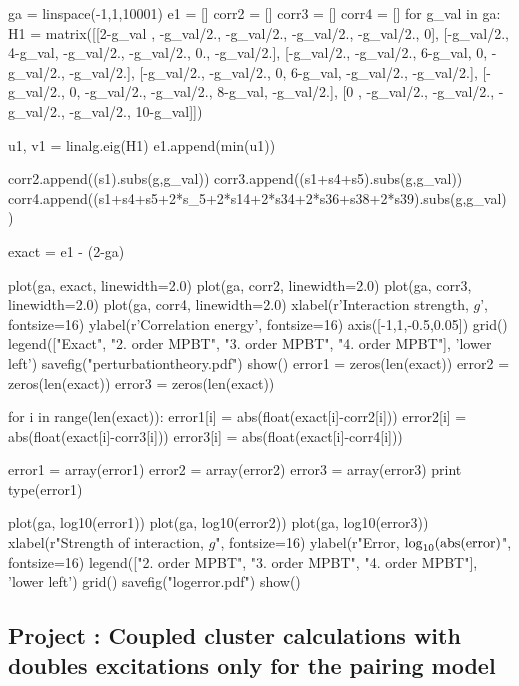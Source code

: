 \documentclass[%
twoside,                 %
final,                   %
10pt]{article}
\newenvironment{doconceexercise}{}{}
\newcounter{doconceexercisecounter}
\begin{document}
\begin{doconceexercise}
ga = linspace(-1,1,10001)
e1 = []
corr2 = []
corr3 = []
corr4 = []
for g_val in ga:
	H1 = matrix([[2-g_val , -g_val/2.,  -g_val/2., -g_val/2., -g_val/2.,     0], 
		        [-g_val/2.,   4-g_val,  -g_val/2., -g_val/2.,    0., -g_val/2.],
		        [-g_val/2., -g_val/2.,    6-g_val,     0, -g_val/2., -g_val/2.],
				[-g_val/2., -g_val/2.,      0,   6-g_val, -g_val/2., -g_val/2.],
				[-g_val/2.,     0,  -g_val/2., -g_val/2.,   8-g_val, -g_val/2.],
				[0    , -g_val/2.,  -g_val/2., -g_val/2., -g_val/2.,  10-g_val]]) 

	u1, v1 = linalg.eig(H1)
	e1.append(min(u1))

	corr2.append((s1).subs(g,g_val))
	corr3.append((s1+s4+s5).subs(g,g_val))
	corr4.append((s1+s4+s5+2*s_5+2*s14+2*s34+2*s36+s38+2*s39).subs(g,g_val))

exact = e1 - (2-ga)

plot(ga, exact, linewidth=2.0)
plot(ga, corr2, linewidth=2.0)
plot(ga, corr3, linewidth=2.0)
plot(ga, corr4, linewidth=2.0)
xlabel(r'Interaction strength, $g$', fontsize=16)
ylabel(r'Correlation energy', fontsize=16)
axis([-1,1,-0.5,0.05])
grid()
legend(["Exact", "2. order MPBT", "3. order MPBT", "4. order MPBT"], 'lower left')
savefig("perturbationtheory.pdf")
show()
error1 = zeros(len(exact))
error2 = zeros(len(exact))
error3 = zeros(len(exact))

for i in range(len(exact)):
	error1[i] = abs(float(exact[i]-corr2[i]))
	error2[i] = abs(float(exact[i]-corr3[i]))
	error3[i] = abs(float(exact[i]-corr4[i]))

error1 = array(error1)
error2 = array(error2)
error3 = array(error3)
print type(error1)

plot(ga, log10(error1))
plot(ga, log10(error2))
plot(ga, log10(error3))
xlabel(r"Strength of interaction, $g$", fontsize=16)
ylabel(r"Error, $\log_{\rm 10}({\rm abs}({\rm error})$", fontsize=16)
legend(["2. order MPBT", "3. order MPBT", "4. order MPBT"], 'lower left')
grid()
savefig("logerror.pdf")
show()
\epypro


\end{doconceexercise}




\begin{doconceexercise}

\subsection*{Project \thedoconceexercisecounter: Coupled cluster calculations with doubles excitations only for the pairing model}


\end{doconceexercise}
\end{document}
